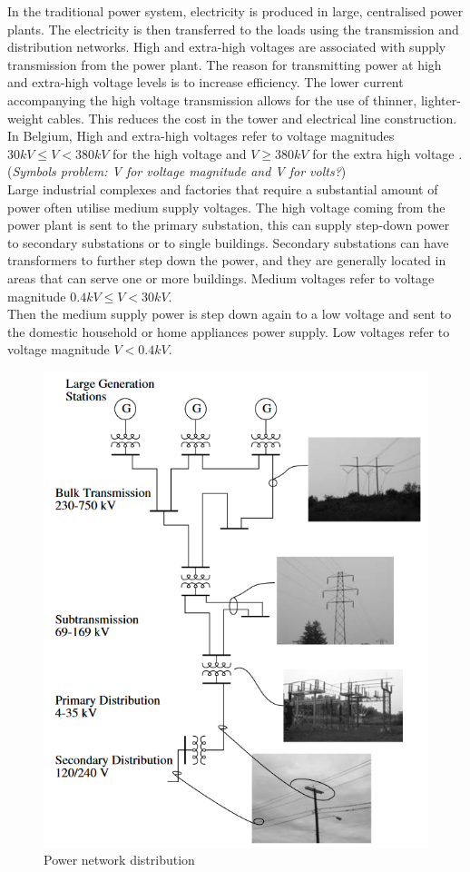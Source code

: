 In the traditional power system, electricity is produced in large, centralised power plants. The electricity is then transferred to the loads using the transmission and distribution networks. High and extra-high voltages are associated with supply transmission from the power plant. The reason for transmitting power at high and extra-high voltage levels is to increase efficiency. The lower current accompanying the high voltage transmission allows for the use of thinner, lighter-weight cables. This reduces the cost in the tower and electrical line construction. In Belgium, High and extra-high voltages refer to voltage magnitudes $30 kV \leq V < 380 kV$ for the high voltage and $V \geq 380 kV$ for the extra high voltage \cite{elia}. (\emph{Symbols problem: V for voltage magnitude and V for volts?})\\
Large industrial complexes and factories that require a substantial amount of power often utilise medium supply voltages. The high voltage coming from the power plant is sent to the primary substation, this can supply step-down power to secondary substations or to single buildings. Secondary substations can have transformers to further step down the power, and they are generally located in areas that can serve one or more buildings. Medium voltages refer to voltage magnitude $0.4 kV \leq V < 30 kV$. \\
Then the medium supply power is step down again to a low voltage and sent to the domestic household or home appliances power supply. Low voltages refer to voltage magnitude $V < 0.4 kV$. \\
\begin{figure}[H]
\centering
    \includegraphics[width=.25\linewidth]{images/Background/DN/DN.PNG}
\caption[Power network distribution]{Power network distribution \cite{EPD}}
\end{figure}


